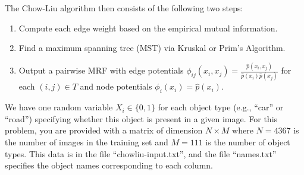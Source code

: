 \documentclass{article}
\begin{document}
\begin{enumerate}


The Chow-Liu algorithm then consists of the following two steps:
\begin{enumerate}
    \item Compute each edge weight based on the empirical mutual information.
    \item Find a maximum spanning tree (MST) via Kruskal or Prim's Algorithm.
    \item Output a pairwise MRF with edge potentials $\phi_{ij}(x_i,x_j) = \frac{\hat{p}(x_i,x_j)}{\hat{p}(x_i)\hat{p}(x_j)}$ for each $(i,j)\in T$ and node potentials $\phi_i(x_i) = \hat{p}(x_i)$.
\end{enumerate}

We have one random variable $X_i\in \{0,1\}$ for each object type (e.g., ``car'' or ``road'') specifying whether this object is present in a given image. For this problem, you are provided with a matrix of dimension $N \times M$ where $N=4367$ is the number of images in the training set and $M=111$ is the number of object types. This data is in the file ``chowliu-input.txt'', and the file ``names.txt'' specifies the object names corresponding to each column.


\end{enumerate}
\end{document}
